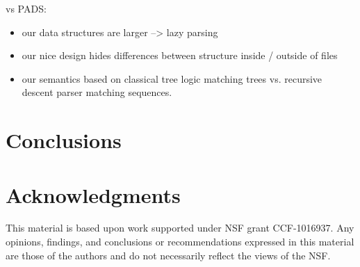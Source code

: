 \documentclass[natbib]{sigplanconf}
\begin{document}
vs PADS:  
\begin{itemize}
\item our data structures are larger --> lazy parsing
\item our nice design hides differences between structure inside /
outside of files
\item our semantics based on classical tree logic matching trees vs. 
recursive descent parser matching sequences.
\end{itemize}

\section{Conclusions}
\label{sec:conclusion}


\section*{Acknowledgments}

This material is based upon work 
supported under NSF grant CCF-1016937.
Any opinions, findings, and conclusions or recommendations
   expressed in this material are those of the authors and do not
   necessarily reflect the views of the NSF.


%



%
\end{document}
